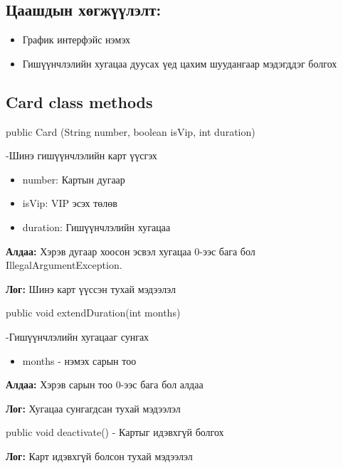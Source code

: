 \documentclass[a4paper, 11pt]{article}
\begin{document}
\subsection*{Цаашдын хөгжүүлэлт: }
\begin{itemize}
\item График интерфэйс нэмэх
\item Гишүүнчлэлийн хугацаа дуусах үед цахим шуудангаар мэдэгддэг болгох
\end{itemize}
\subsection*{Card class methods}

\begin{description}
    \item {public Card (String number, boolean isVip, int duration)}
\item  -Шинэ гишүүнчлэлийн карт үүсгэх
    \begin{itemize}
        \item number: Картын дугаар
        \item isVip: VIP эсэх төлөв
        \item duration: Гишүүнчлэлийн хугацаа
    \end{itemize}
    
    \textbf{Алдаа:} Хэрэв дугаар хоосон эсвэл хугацаа 0-ээс бага бол IllegalArgumentException. 
    
    \textbf{Лог:} Шинэ карт үүссэн тухай мэдээлэл
    
    \item {public void extendDuration(int months)}
    \item -Гишүүнчлэлийн хугацааг сунгах
    \begin{itemize}
    \item  months - нэмэх сарын тоо
     \end{itemize}
    \textbf{Алдаа:} Хэрэв сарын тоо 0-ээс бага бол алдаа
    
    \textbf{Лог:} Хугацаа сунгагдсан тухай мэдээлэл
    
    \item {public void deactivate()}
    - Картыг идэвхгүй болгох
    
    \textbf{Лог:} Карт идэвхгүй болсон тухай мэдээлэл
\end{description}
\end{document}
